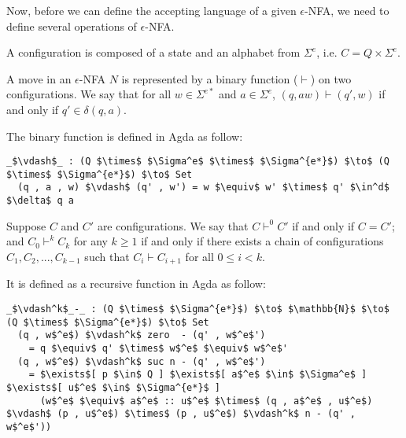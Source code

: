\par Now, before we can define the accepting language of a given
\(\epsilon\)-NFA, we need to define several operations of
\(\epsilon\)-NFA. 

\begin{defn}
\noindent A configuration is composed of a state and an alphabet from
\(\Sigma^e\), i.e. \(C = Q \times \Sigma^e\). 
\end{defn}

\begin{defn}
\noindent A move in an \(\epsilon\)-NFA \(N\) is
represented by a binary function (\(\vdash\)) on two configurations. We say
that for all \(w \in \Sigma^{e*}\) and \(a \in \Sigma^e\), \((q, aw)
\vdash (q' , w)\) if and only if \(q' \in \delta (q , a)\). 
\end{defn}

\par The binary function is defined in Agda as follow: 
\begin{lstlisting}[mathescape=true,xleftmargin=.3\textwidth]
  _$\vdash$_ : (Q $\times$ $\Sigma^e$ $\times$ $\Sigma^{e*}$) $\to$ (Q $\times$ $\Sigma^{e*}$) $\to$ Set
  (q , a , w) $\vdash$ (q' , w') = w $\equiv$ w' $\times$ q' $\in^d$ $\delta$ q a
\end{lstlisting}

\begin{defn}
\noindent Suppose \(C\) and \(C'\) are configurations. We say that \(C \vdash^0 C'\) if and only
if \(C = C'\); and \(C_0 \vdash^k C_k\) for any \(k \geq 1\) if and only if there exists a chain of
configurations \(C_1, C_2, ..., C_{k-1}\) such that \(C_i \vdash C_{i+1}\) for all \(0 \leq i < k\). 
\end{defn}

\par It is defined as a recursive function in Agda as follow: 
\begin{lstlisting}[mathescape=true,xleftmargin=.3\textwidth]
  _$\vdash^k$_-_ : (Q $\times$ $\Sigma^{e*}$) $\to$ $\mathbb{N}$ $\to$ (Q $\times$ $\Sigma^{e*}$) $\to$ Set
  (q , w$^e$) $\vdash^k$ zero  - (q' , w$^e$')
    = q $\equiv$ q' $\times$ w$^e$ $\equiv$ w$^e$'
  (q , w$^e$) $\vdash^k$ suc n - (q' , w$^e$') 
    = $\exists$[ p $\in$ Q ] $\exists$[ a$^e$ $\in$ $\Sigma^e$ ] $\exists$[ u$^e$ $\in$ $\Sigma^{e*}$ ]
      (w$^e$ $\equiv$ a$^e$ :: u$^e$ $\times$ (q , a$^e$ , u$^e$) $\vdash$ (p , u$^e$) $\times$ (p , u$^e$) $\vdash^k$ n - (q' , w$^e$'))
\end{lstlisting}

